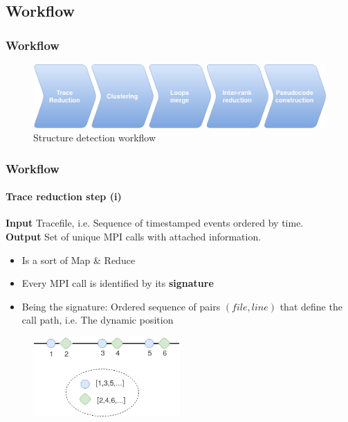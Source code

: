 \documentclass{beamer}
\begin{document}
\subsection{Workflow}
\begin{frame}
\frametitle{Workflow}
\begin{figure}
	\includegraphics[width=\textwidth]{imgs/workflow.png}
	\caption{Structure detection workflow}
\end{figure}
\end{frame}

\begin{frame}
\frametitle{Workflow}
\framesubtitle{Trace reduction step (i)}
\textbf{Input} Tracefile, i.e. Sequence of timestamped events ordered by time.\\
\textbf{Output} Set of unique MPI calls with attached information.
\vspace{10px}
\pause
\begin{itemize}
	\item Is a sort of Map \& Reduce
	\item Every MPI call is identified by its \textbf{signature}
	\item Being the signature: Ordered sequence of pairs $(file,line)$ that define the call path, i.e. The dynamic position
\end{itemize}
\pause
\begin{figure}
	\includegraphics[width=0.5\textwidth]{imgs/workflow_reduction.png}
\end{figure}
\end{frame}
\end{document}
